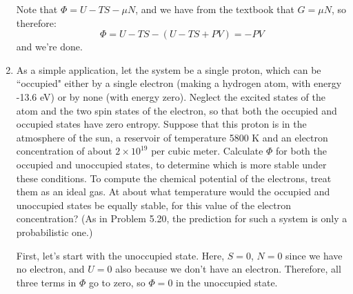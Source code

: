\documentclass[10pt]{article}
\begin{document}
\begin{enumerate}[label=\alph*)]
			\begin{solution}
				Note that $\Phi = U - TS - \mu N$, and we have from the textbook that $G = \mu N$, so therefore:
				\[
				\Phi = U - TS - (U - TS + PV) = -PV
				\] 
				and we're done.
			\end{solution}
		\item As a simple application, let the system be a single proton, which can be ``occupied" either 
			by a single electron (making a hydrogen atom, with energy -13.6 eV) or by none (with energy 
			zero). Neglect the excited states of the atom and the two spin states of the electron, so that 
			both the occupied and occupied states have zero entropy. Suppose that this proton is in the 
			atmosphere of the sun, a reservoir of temperature 5800 K and an electron concentration of 
			about $2 \times 10^{19}$ per cubic meter. Calculate \( \Phi\) for both the occupied and 
			unoccupied states, to determine which is more stable under these conditions. To compute the chemical
			potential of the electrons, treat them as an ideal gas. At about what 
			temperature would the occupied and unoccupied states be equally stable, for this value of the 
			electron concentration? (As in Problem 5.20, the prediction for such a system is only 
			a probabilistic one.)

			\begin{solution}
				First, let's start with the unoccupied state. Here, $S = 0$, $N = 0$ since we have no electron, 
				and $U = 0$ also because we don't have an electron. Therefore, all three terms 
				in $\Phi$ go to zero, so $\Phi = 0$ in the unoccupied state. 


\end{solution}
\end{enumerate}
\end{document}
